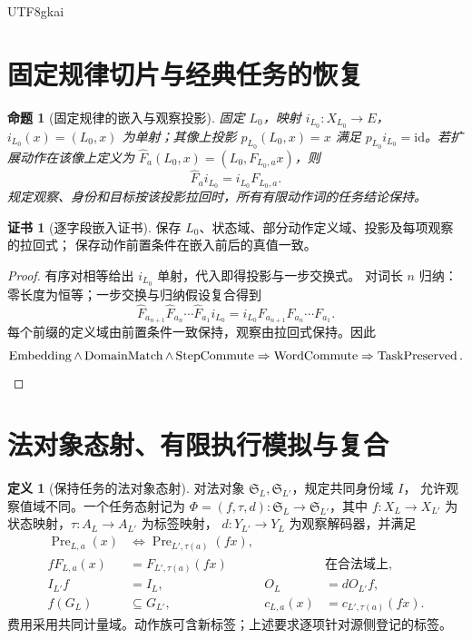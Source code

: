 \documentclass[12pt,a4paper,openany,notitlepage]{report}
\theoremstyle{plain}
\newtheorem{proposition}[theorem]{命题}
\theoremstyle{definition}
\newtheorem{definition}[theorem]{定义}
\newtheorem*{certificate}{证书}
\theoremstyle{remark}
\def\mathcal#1{#1}\def\mathsf#1{#1}\def\mathbb#1{#1}%
\begin{document}
\begin{CJK*}{UTF8}{gkai}
\section{固定规律切片与经典任务的恢复}

\begin{proposition}[固定规律的嵌入与观察投影]
\label{hgov:prop:slice}
固定 $L_0$，映射 $i_{L_0}:X_{L_0}\to\mathcal E$，
$i_{L_0}(x)=(L_0,x)$ 为单射；其像上投影 $p_{L_0}(L_0,x)=x$ 满足
$p_{L_0}i_{L_0}=\mathrm{id}$。若扩展动作在该像上定义为
$\widehat F_a(L_0,x)=(L_0,F_{L_0,a}x)$，则
\[
\widehat F_ai_{L_0}=i_{L_0}F_{L_0,a}.
\]
规定观察、身份和目标按该投影拉回时，所有有限动作词的任务结论保持。
\end{proposition}
\begin{certificate}[逐字段嵌入证书]
保存 $L_0$、状态域、部分动作定义域、投影及每项观察的拉回式；
保存动作前置条件在嵌入前后的真值一致。
\end{certificate}
\begin{proof}
有序对相等给出 $i_{L_0}$ 单射，代入即得投影与一步交换式。
对词长 $n$ 归纳：零长度为恒等；一步交换与归纳假设复合得到
\[
\widehat F_{a_{n+1}}\widehat F_{a_n}\cdots\widehat F_{a_1}i_{L_0}
=i_{L_0}F_{a_{n+1}}F_{a_n}\cdots F_{a_1}.
\]
每个前缀的定义域由前置条件一致保持，观察由拉回式保持。因此
\[
\operatorname{Embedding}\land\operatorname{DomainMatch}
\land\operatorname{StepCommute}
\Rightarrow\operatorname{WordCommute}
\Rightarrow\operatorname{TaskPreserved}.\qedhere
\]
\end{proof}

\section{法对象态射、有限执行模拟与复合}

\begin{definition}[保持任务的法对象态射]
\label{exp:law:morphism}
对法对象 $\mathfrak S_L,\mathfrak S_{L'}$，规定共同身份域 $\mathcal I$，
允许观察值域不同。一个任务态射记为
$\Phi=(f,\tau,d):\mathfrak S_L\to\mathfrak S_{L'}$，其中
$f:X_L\to X_{L'}$ 为状态映射，$\tau:A_L\to A_{L'}$ 为标签映射，
$d:Y_{L'}\to Y_L$ 为观察解码器，并满足
\[
 \begin{aligned}
 \operatorname{Pre}_{L,a}(x)
 &\Longleftrightarrow\operatorname{Pre}_{L',\tau(a)}(f x),\\
 fF_{L,a}(x)&=F_{L',\tau(a)}(fx)
 &&\text{在合法域上},\\
 I_{L'}f&=I_L,& O_L&=dO_{L'}f,\\
 f(G_L)&\subseteq G_{L'},&
 c_{L,a}(x)&=c_{L',\tau(a)}(fx).
 \end{aligned}
\]
费用采用共同计量域。动作族可含新标签；上述要求逐项针对源侧登记的标签。
\end{definition}


\end{CJK*}
\end{document}
